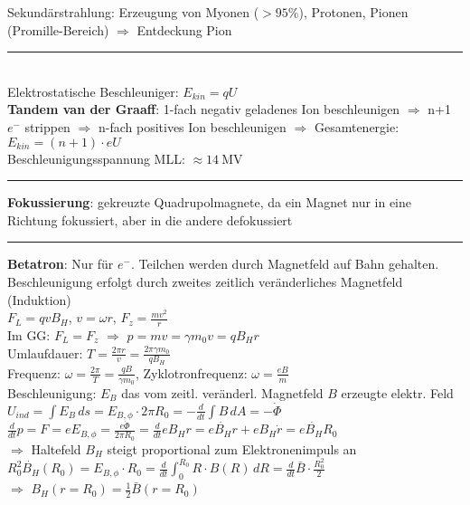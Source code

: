 \documentclass[10pt,twoside,a4paper]{article}
\begin{document}
\begin{multicols*}{3}
Sekundärstrahlung: Erzeugung von Myonen ($> 95\%$), Protonen, Pionen (Promille-Bereich) $\Rightarrow$ Entdeckung Pion
\\ \rule[0ex]{\columnwidth}{0.5pt}
\ \\
Elektrostatische Beschleuniger: $E_{kin} = q U$ \\
\textbf{Tandem van der Graaff}: 1-fach negativ geladenes Ion beschleunigen $\Rightarrow$ n+1 $e^-$ strippen $\Rightarrow$ n-fach positives Ion beschleunigen $\Rightarrow$ Gesamtenergie: $E_{kin} = (n+1) \cdot e U$ \\
Beschleunigungsspannung MLL: $\approx \SI{14}{\mega\V}$
\\ \rule[0ex]{\columnwidth}{0.5pt}
\textbf{Fokussierung}: gekreuzte Quadrupolmagnete, da ein Magnet nur in eine Richtung fokussiert, aber in die andere defokussiert
\\ \rule[0ex]{\columnwidth}{0.5pt}
\textbf{Betatron}: Nur für $e^-$. Teilchen werden durch Magnetfeld auf Bahn gehalten. Beschleunigung erfolgt durch zweites zeitlich veränderliches Magnetfeld (Induktion) \\
$F_L = q v B_H$, $v = \omega r$, $F_z = \frac{m v^2}{r}$ \\
Im GG: $F_L = F_z$ $\Rightarrow$ $p = m v = \gamma m_0 v = q B_H r$ \\
Umlaufdauer: $T = \frac{2 \pi r}{v} = \frac{2 \pi \gamma m_0}{q B_H}$ \\
Frequenz: $\omega = \frac{2 \pi}{T} = \frac{q B}{\gamma m_0}$, Zyklotronfrequenz: $\omega = \frac{e B}{m}$ \\
Beschleunigung: $E_B$ das vom zeitl. veränderl. Magnetfeld $B$ erzeugte elektr. Feld \\
$U_{ind} = \int E_B \,ds = E_{B,\phi} \cdot 2 \pi R_0 = - \frac{d}{dt} \int B \,dA = - \dot{\Phi}$ \\
$\frac{d}{dt} p = F = e E_{B,\phi} = \frac{e \dot{\Phi}}{2 \pi R_0} = \frac{d}{dt} e B_H r = e \dot{B_H} r +  e B_H \dot{r} = e \dot{B_H} R_0$ \\
$\Rightarrow$ Haltefeld $B_H$ steigt proportional zum Elektronenimpuls an \\
$R_0^2 \dot{B_H}(R_0) = E_{B,\phi} \cdot R_0 = \frac{d}{dt} \int_{0}^{R_0} R \cdot B(R) \,dR = \frac{d}{dt} \bar{B} \cdot \frac{R_0^2}{2}$ \\
$\Rightarrow$ $B_H(r = R_0) = \frac{1}{2} \bar{B}(r = R_0)$ \\

\end{multicols*}
\end{document}
